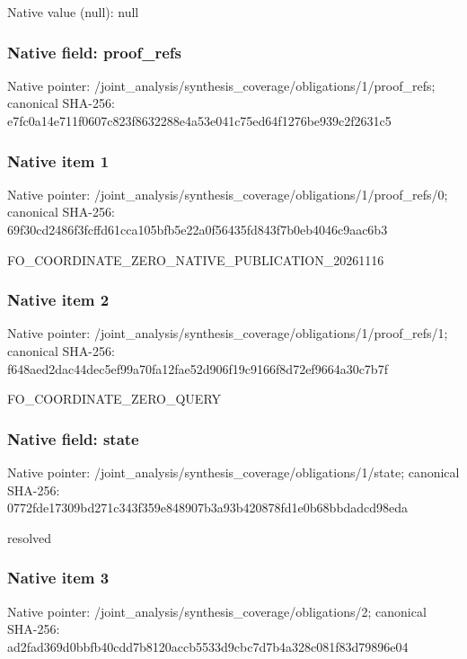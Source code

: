 \documentclass[10pt,a4paper]{article}
\begin{document}
Native value (null): null

\subsubsection{Native field: proof\_\allowbreak{}refs}
Native pointer: /joint\_\allowbreak{}analysis/synthesis\_\allowbreak{}coverage/obligations/1/proof\_\allowbreak{}refs; canonical SHA-256: e7fc0a14e711f0607c823f8632288e4a53e041c75ed64f1276be939c2f2631c5

\subsubsection{Native item 1}
Native pointer: /joint\_\allowbreak{}analysis/synthesis\_\allowbreak{}coverage/obligations/1/proof\_\allowbreak{}refs/0; canonical SHA-256: 69f30cd2486f3fcffd61cca105bfb5e22a0f56435fd843f7b0eb4046c9aac6b3

\begingroup\raggedright\sloppy FO\_\allowbreak{}COORDINATE\_\allowbreak{}ZERO\_\allowbreak{}NATIVE\_\allowbreak{}PUBLICATION\_\allowbreak{}20261116\par\endgroup

\subsubsection{Native item 2}
Native pointer: /joint\_\allowbreak{}analysis/synthesis\_\allowbreak{}coverage/obligations/1/proof\_\allowbreak{}refs/1; canonical SHA-256: f648aed2dac44dec5ef99a70fa12fae52d906f19c9166f8d72ef9664a30c7b7f

\begingroup\raggedright\sloppy FO\_\allowbreak{}COORDINATE\_\allowbreak{}ZERO\_\allowbreak{}QUERY\par\endgroup

\subsubsection{Native field: state}
Native pointer: /joint\_\allowbreak{}analysis/synthesis\_\allowbreak{}coverage/obligations/1/state; canonical SHA-256: 0772fde17309bd271c343f359e848907b3a93b420878fd1e0b68bbdadcd98eda

\begingroup\raggedright\sloppy resolved\par\endgroup

\subsubsection{Native item 3}
Native pointer: /joint\_\allowbreak{}analysis/synthesis\_\allowbreak{}coverage/obligations/2; canonical SHA-256: ad2fad369d0bbfb40cdd7b8120accb5533d9cbc7d7b4a328c081f83d79896e04
\end{document}
